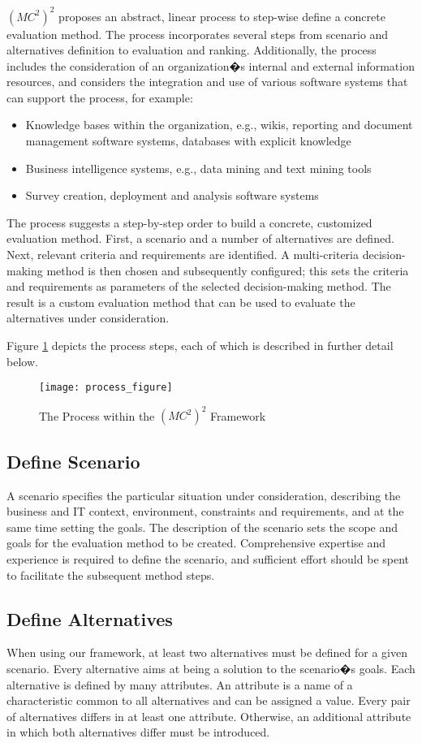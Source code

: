 \documentclass[journal,final,a4paper,twoside]{IEEEtran}
\begin{document}
$(MC^2)^2$ proposes an abstract, linear process to step-wise define a concrete evaluation method. The process incorporates several steps from scenario and alternatives definition to evaluation and ranking. Additionally, the process includes the consideration of an organization�s internal and external information resources, and considers the integration and use of various software systems that can support the process, for example: 
\begin{itemize}
\item Knowledge bases within the organization, e.g., wikis, reporting and document management software systems, databases with explicit knowledge
\item Business intelligence systems, e.g., data mining and text mining tools
\item Survey creation, deployment and analysis software systems
\end{itemize}
The process suggests a step-by-step order to build a concrete, customized evaluation method. First, a scenario and a number of alternatives are defined. Next, relevant criteria and requirements are identified. A multi-criteria decision-making method is then chosen and subsequently configured; this sets the criteria and requirements as parameters of the selected decision-making method. The result is a custom evaluation method that can be used to evaluate the alternatives under consideration.

Figure \ref{fig1} depicts the process steps, each of which is described in further detail below.  

\begin{figure}[!t]
\centering
\texttt{[image: process\_figure]}
\caption{The Process within the $(MC^2)^2$ Framework}
\label{fig1}
\end{figure}

\subsection{Define Scenario}
A scenario specifies the particular situation under consideration, describing the business and IT context, environment, constraints and requirements, and at the same time setting the goals. The description of the scenario sets the scope and goals for the evaluation method to be created. Comprehensive expertise and experience is required to define the scenario, and sufficient effort should be spent to facilitate the subsequent method steps.


\subsection{Define Alternatives}
When using our framework, at least two alternatives must be defined for a given scenario. Every alternative aims at being a solution to the scenario�s goals. Each alternative is defined by many attributes. An attribute is a name of a characteristic common to all alternatives and can be assigned a value. Every pair of alternatives differs in at least one attribute. Otherwise, an additional attribute in which both alternatives differ must be introduced. 
\end{document}
